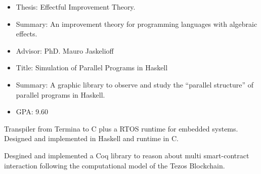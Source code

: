 

\newpage

    \begin{itemize}
        \item Thesis: Effectful Improvement Theory.
        \item Summary: An improvement theory for programming languages with
                algebraic effects.
        \item Advisor: PhD. Mauro Jaskelioff
    \end{itemize}
    \divider

    \begin{itemize}
        \item Title: Simulation of Parallel Programs in Haskell
        \item Summary: A graphic library to observe and study the ``parallel
                structure'' of parallel programs in Haskell.
        \item GPA: 9.60
    \end{itemize}

    Transpiler from Termina to C plus a RTOS runtime for embedded systems.
    Designed and implemented in Haskell and runtime in C.

    \divider

    Desgined and implemented a Coq library to reason about multi smart-contract
interaction following the computational model of the Tezos Blockchain.

